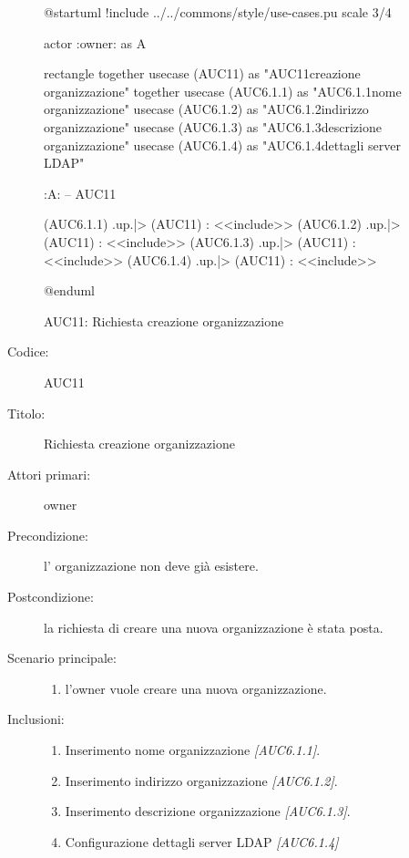 \documentclass[casi-duso]{subfiles}
\begin{document}
\begin{figure}[h!]
  \centering
  \begin{plantuml}
  @startuml
  !include ../../commons/style/use-cases.pu
  scale 3/4

  actor :owner: as A

  rectangle {
    together {
      usecase (AUC11) as "AUC11\nRichiesta creazione organizzazione"
    }
    together {
      usecase (AUC6.1.1) as "AUC6.1.1\nInserisci nome organizzazione"
      usecase (AUC6.1.2) as "AUC6.1.2\nInserisci indirizzo organizzazione"
      usecase (AUC6.1.3) as "AUC6.1.3\nInserisci descrizione organizzazione"
      usecase (AUC6.1.4) as "AUC6.1.4\nConfigurazione dettagli server LDAP"
    }
  }

  :A: -- AUC11

  (AUC6.1.1) .up.|> (AUC11) : <<include>>
  (AUC6.1.2) .up.|> (AUC11) : <<include>>
  (AUC6.1.3) .up.|> (AUC11) : <<include>>
  (AUC6.1.4) .up.|> (AUC11) : <<include>>

  @enduml
  \end{plantuml}
  \caption{AUC11: Richiesta creazione organizzazione}
  \label{fig:auc11}
\end{figure}

\begin{description}
  \item[Codice:] AUC11
  \item[Titolo:] Richiesta creazione organizzazione
  \item[Attori primari:] owner
  \item[Precondizione:] l' organizzazione non deve già esistere.
  \item[Postcondizione:] la richiesta di creare una nuova organizzazione è stata posta.
  \item[Scenario principale:]
  \begin{enumerate}
    \item l'owner vuole creare una nuova organizzazione.
  \end{enumerate}
  \item[Inclusioni:]
  \begin{enumerate}
    \item Inserimento nome organizzazione \emph{[AUC6.1.1]}.
    \item Inserimento indirizzo organizzazione \emph{[AUC6.1.2]}.
    \item Inserimento descrizione organizzazione \emph{[AUC6.1.3]}.
    \item Configurazione dettagli server LDAP \emph{[AUC6.1.4]}
  \end{enumerate}
\end{description}
\end{document}
